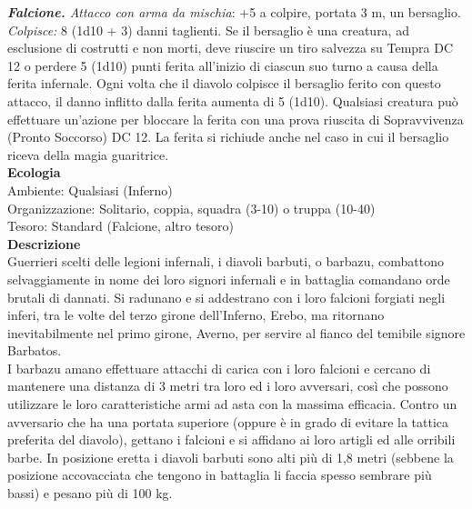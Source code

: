 \begin{multicols}{2}
\emph{\textbf{Falcione.} Attacco con arma da mischia}: +5 a colpire, portata 3 m, un bersaglio.
\emph{Colpisce:} 8 (1d10 + 3) danni taglienti. Se il bersaglio è una creatura, ad esclusione di costrutti e non morti, deve riuscire un tiro salvezza su Tempra DC 12 o perdere 5 (1d10) punti ferita all'inizio di ciascun suo turno a causa della ferita infernale. Ogni volta che il diavolo colpisce il bersaglio ferito con questo attacco, il  danno inflitto dalla ferita aumenta di 5 (1d10). Qualsiasi creatura può effettuare un'azione per bloccare la ferita con una prova riuscita di Sopravvivenza (Pronto Soccorso) DC 12. La ferita si richiude anche nel caso in cui il bersaglio riceva della magia guaritrice.\\
\textbf{Ecologia}\\
Ambiente: Qualsiasi (Inferno)\\
Organizzazione: Solitario, coppia, squadra (3-10) o truppa (10-40)\\
Tesoro: Standard (Falcione, altro tesoro)\\
\textbf{Descrizione}\\
Guerrieri scelti delle legioni infernali, i diavoli barbuti, o barbazu, combattono selvaggiamente in nome dei loro signori infernali e in battaglia comandano orde brutali di dannati. Si radunano e si addestrano con i loro falcioni forgiati negli inferi, tra le volte del terzo girone dell’Inferno, Erebo, ma ritornano inevitabilmente nel primo girone, Averno, per servire al fianco del temibile signore Barbatos.\\
I barbazu amano effettuare attacchi di carica con i loro falcioni e cercano di mantenere una distanza di 3 metri tra loro ed i loro avversari, così che possono utilizzare le loro caratteristiche armi ad asta con la massima efficacia. Contro un avversario che ha una portata superiore (oppure è in grado di evitare la tattica preferita del diavolo), gettano i falcioni e si affidano ai loro artigli ed alle orribili barbe. In posizione eretta i diavoli barbuti sono alti più di 1,8 metri (sebbene la posizione accovacciata che tengono in battaglia li faccia spesso sembrare più bassi) e pesano più di 100 kg.\\


\end{multicols}
